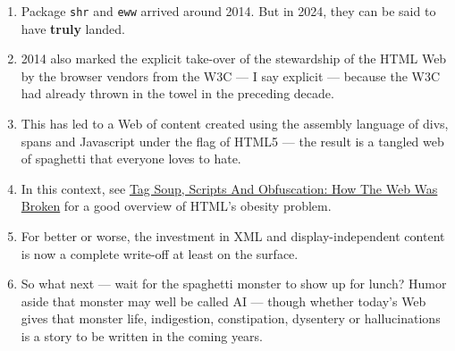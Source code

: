 \documentclass[11pt]{article}
\begin{document}
\begin{enumerate}
\item Package \texttt{shr} and \texttt{eww} arrived around 2014. But in 2024, they
can be said to have \textbf{truly} landed.
\item 2014 also  marked the explicit take-over of the stewardship of the HTML Web by the
browser vendors from the W3C  --- I say
explicit ---  because the W3C had already thrown in the towel in the
preceding decade.
\item This  has led to a Web of content  created using the assembly
language of divs, spans and Javascript  under the flag of HTML5 ---
the result is a tangled web of spaghetti that everyone loves to hate.
\item In this context, see \href{https://idlewords.com/talks/website\_obesity.htm}{Tag Soup, Scripts And Obfuscation: How The
Web Was Broken} for  a good overview of  HTML's obesity problem.
\item For better or worse, the investment in XML and display-independent
content is now a complete write-off at least on the surface.

\item So what next --- wait for the spaghetti monster to show up for
lunch? Humor aside that monster may well be called AI ---  though
whether  today's Web gives that monster life, indigestion,
constipation,   dysentery or hallucinations  is a story to be
written in the coming years.


\end{enumerate}
\end{document}
